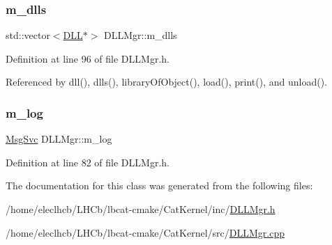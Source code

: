 \subsubsection{\texorpdfstring{m\+\_\+dlls}{m\_dlls}}
{\footnotesize\ttfamily std\+::vector$<$\hyperlink{classDLL}{D\+LL}$\ast$$>$ D\+L\+L\+Mgr\+::m\+\_\+dlls\hspace{0.3cm}{\ttfamily [private]}}



Definition at line 96 of file D\+L\+L\+Mgr.\+h.



Referenced by dll(), dlls(), library\+Of\+Object(), load(), print(), and unload().

\mbox{\label{classDLLMgr_a64b523faed64378451ee76f6fbf0800d}} 
\subsubsection{\texorpdfstring{m\+\_\+log}{m\_log}}
{\footnotesize\ttfamily \hyperlink{classMsgSvc}{Msg\+Svc} D\+L\+L\+Mgr\+::m\+\_\+log\hspace{0.3cm}{\ttfamily [private]}}



Definition at line 82 of file D\+L\+L\+Mgr.\+h.



The documentation for this class was generated from the following files\+:\begin{DoxyCompactItemize}
\item 
/home/eleclhcb/\+L\+H\+Cb/lbcat-\/cmake/\+Cat\+Kernel/inc/\hyperlink{DLLMgr_8h}{D\+L\+L\+Mgr.\+h}\item 
/home/eleclhcb/\+L\+H\+Cb/lbcat-\/cmake/\+Cat\+Kernel/src/\hyperlink{DLLMgr_8cpp}{D\+L\+L\+Mgr.\+cpp}\end{DoxyCompactItemize}
